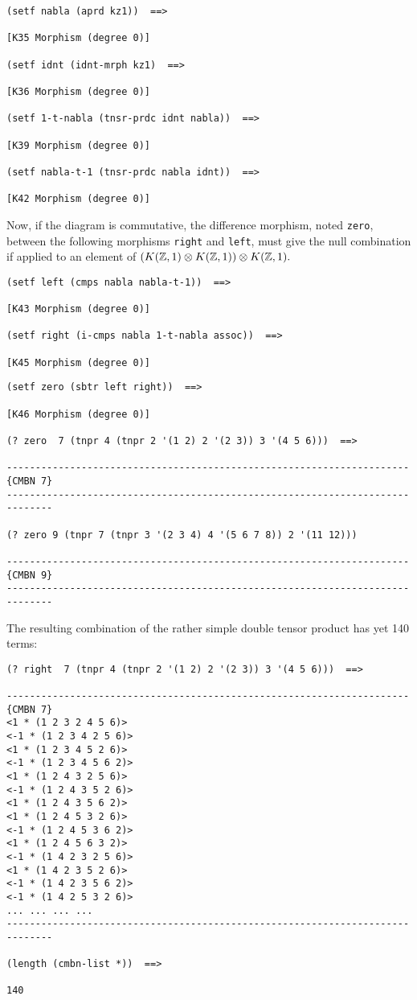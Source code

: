 {\footnotesize\begin{verbatim}
(setf nabla (aprd kz1))  ==>

[K35 Morphism (degree 0)]

(setf idnt (idnt-mrph kz1)  ==>

[K36 Morphism (degree 0)]

(setf 1-t-nabla (tnsr-prdc idnt nabla))  ==>

[K39 Morphism (degree 0)]

(setf nabla-t-1 (tnsr-prdc nabla idnt))  ==>

[K42 Morphism (degree 0)]
\end{verbatim}}
Now, if the diagram is commutative, the difference morphism, noted {\tt zero}, between
the following morphisms {\tt right} and {\tt left}, must give the null combination if applied to an
element of $(K({\mathbb{Z}}, 1) \otimes K({\mathbb{Z}}, 1)) \otimes K({\mathbb{Z}}, 1).$
{\footnotesize\begin{verbatim}
(setf left (cmps nabla nabla-t-1))  ==>

[K43 Morphism (degree 0)]

(setf right (i-cmps nabla 1-t-nabla assoc))  ==>

[K45 Morphism (degree 0)]
\end{verbatim}}
\newpage
{\footnotesize\begin{verbatim}
(setf zero (sbtr left right))  ==>

[K46 Morphism (degree 0)]

(? zero  7 (tnpr 4 (tnpr 2 '(1 2) 2 '(2 3)) 3 '(4 5 6)))  ==>

----------------------------------------------------------------------{CMBN 7}
------------------------------------------------------------------------------

(? zero 9 (tnpr 7 (tnpr 3 '(2 3 4) 4 '(5 6 7 8)) 2 '(11 12)))

----------------------------------------------------------------------{CMBN 9}
------------------------------------------------------------------------------
\end{verbatim}}
The resulting combination of the rather simple double tensor product has yet
140 terms:
{\footnotesize\begin{verbatim}
(? right  7 (tnpr 4 (tnpr 2 '(1 2) 2 '(2 3)) 3 '(4 5 6)))  ==>

----------------------------------------------------------------------{CMBN 7}
<1 * (1 2 3 2 4 5 6)>
<-1 * (1 2 3 4 2 5 6)>
<1 * (1 2 3 4 5 2 6)>
<-1 * (1 2 3 4 5 6 2)>
<1 * (1 2 4 3 2 5 6)>
<-1 * (1 2 4 3 5 2 6)>
<1 * (1 2 4 3 5 6 2)>
<1 * (1 2 4 5 3 2 6)>
<-1 * (1 2 4 5 3 6 2)>
<1 * (1 2 4 5 6 3 2)>
<-1 * (1 4 2 3 2 5 6)>
<1 * (1 4 2 3 5 2 6)>
<-1 * (1 4 2 3 5 6 2)>
<-1 * (1 4 2 5 3 2 6)>
... ... ... ...
------------------------------------------------------------------------------

(length (cmbn-list *))  ==>

140
\end{verbatim}}
\newpage

